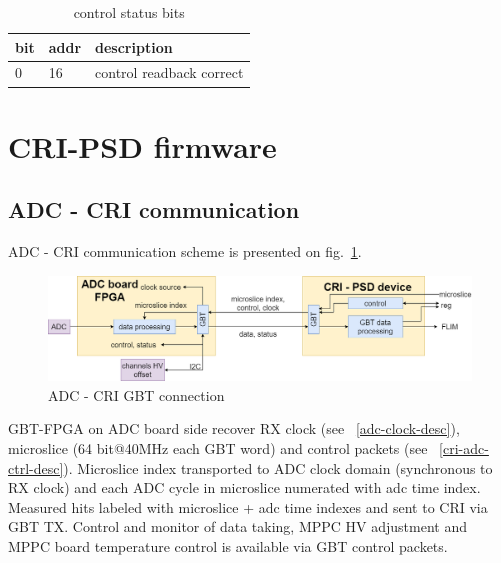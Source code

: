 \documentclass{article}
\begin{document}
\begin{table}[H]
\centering
\begin{tabular}{| l | l | l |}
\hline
bit & addr & description \\ \hline
0 & 16 & control readback correct \\ \hline

\end{tabular}
\caption{control status bits\label{tab14}}
\end{table}




























\section{CRI-PSD firmware}

\subsection{ADC - CRI communication}

ADC - CRI communication scheme is presented on fig.~\ref{fig:adc-cri}. 

\begin{figure}[H]
	\centering 
	\includegraphics[width=1.0\textwidth]{CRI_PSD_spec.png}
	\caption{\label{fig:adc-cri} ADC - CRI GBT connection}
\end{figure}

GBT-FPGA on ADC board side recover RX clock (see ~\ref{adc-clock-desc}), microslice (64 bit@40MHz each GBT word) and control packets (see ~\ref{cri-adc-ctrl-desc}). Microslice index transported to ADC clock domain (synchronous to RX clock) and each ADC cycle in microslice numerated with adc time index. Measured hits labeled with microslice + adc time indexes and sent to CRI via GBT TX. Control and monitor of data taking, MPPC HV adjustment and MPPC board temperature control is available via GBT control packets.
\end{document}
